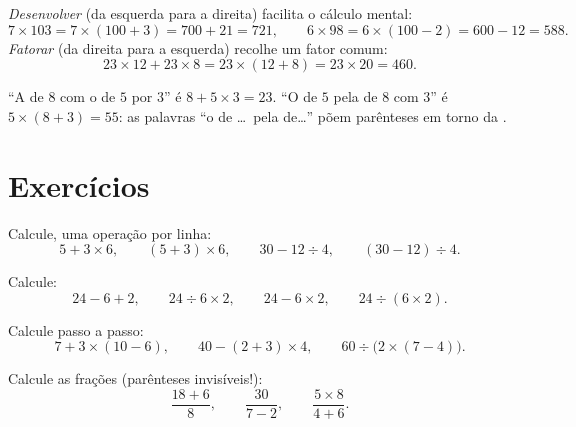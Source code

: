 \begin{example}\label{ex:g7:priorities:distributivity}
\emph{Desenvolver} (da esquerda para a direita) facilita o cálculo
mental:
\[
7 \times 103 = 7 \times (100 + 3) = 700 + 21 = 721,
\qquad
6 \times 98 = 6 \times (100 - 2) = 600 - 12 = 588 .
\]
\emph{Fatorar} (da direita para a esquerda) recolhe um fator comum:
\[
23 \times 12 + 23 \times 8 = 23 \times (12 + 8) = 23 \times 20 = 460 .
\]
\end{example}

\begin{example}\label{ex:g7:priorities:words}
``A  de $8$ com o  de $5$ por $3$'' é
$8 + 5 \times 3 = 23$. ``O  de $5$ pela  de $8$ com $3$'' é
$5 \times (8 + 3) = 55$: as palavras ``o  de \dots\ pela 
de\dots'' põem parênteses em torno da .
\end{example}

\section{Exercícios}

\begin{exercise}[$\star$]\label{exo:g7:priorities:1}
Calcule, uma operação por linha:
\[
5 + 3 \times 6, \qquad
(5 + 3) \times 6, \qquad
30 - 12 \div 4, \qquad
(30 - 12) \div 4 .
\]
\end{exercise}

\begin{exercise}[$\star$]\label{exo:g7:priorities:2}
Calcule:
\[
24 - 6 + 2, \qquad
24 \div 6 \times 2, \qquad
24 - 6 \times 2, \qquad
24 \div (6 \times 2).
\]
\end{exercise}

\begin{exercise}[$\star$]\label{exo:g7:priorities:3}
Calcule passo a passo:
\[
7 + 3 \times (10 - 6), \qquad
40 - (2 + 3) \times 4, \qquad
60 \div \bigl(2 \times (7 - 4)\bigr).
\]
\end{exercise}

\begin{exercise}[$\star$]\label{exo:g7:priorities:4}
Calcule as frações (parênteses invisíveis!):
\[
\frac{18 + 6}{8}, \qquad
\frac{30}{7 - 2}, \qquad
\frac{5 \times 8}{4 + 6} .
\]
\end{exercise}

